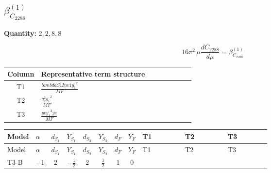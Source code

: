 \documentclass[8pt]{article}
\begin{document}
\begin{landscape}
\section*{$\beta_{C_{2288}}^{(1)}$}
\noindent\textbf{Quantity: }$\mathrm{2,2,8,8}$\par\smallskip
\[16\pi^2\,\mu\frac{d C_{2288}}{d\mu}=\beta_{C_{2288}}^{(1)}\]
\begin{center}
\begin{tabular}{@{}c >{\raggedright\arraybackslash}p{0.82\linewidth}@{}}
\toprule
Column & Representative term structure \\
\midrule
T1 & \(\displaystyle \frac{lambdaS1Inv1 \overline{y_{1}}^{2}}{MF}\) \\
\midrule
T2 & \(\displaystyle \frac{g_{2}^{2} \overline{y_{1}}^{2}}{MF}\) \\
\midrule
T3 & \(\displaystyle \frac{ye \overline{y_{1}}^{2} \overline{ye}}{MF}\) \\
\midrule
\bottomrule
\end{tabular}
\end{center}
\smallskip
\tiny
\begin{longtable}{@{}llcccccc >{\raggedright\arraybackslash}p{0.21\linewidth} >{\raggedright\arraybackslash}p{0.21\linewidth} >{\raggedright\arraybackslash}p{0.21\linewidth}@{}}
\toprule
Model & $\alpha$ & $d_{S_1}$ & $Y_{S_1}$ & $d_{S_2}$ & $Y_{S_2}$ & $d_F$ & $Y_F$ & T1 & T2 & T3 \\
\midrule
\endfirsthead
\toprule
Model & $\alpha$ & $d_{S_1}$ & $Y_{S_1}$ & $d_{S_2}$ & $Y_{S_2}$ & $d_F$ & $Y_F$ & T1 & T2 & T3 \\
\midrule
\endhead
T3-B & $-1$ & $2$ & $-\frac{1}{2}$ & $2$ & $\frac{1}{2}$ & $1$ & $0$ & \scriptsize\adjustbox{max width=\linewidth}{$\begin{gathered} \frac{lambdaS1Inv1 \overline{y_{1}}^{2}}{2 MF}\end{gathered}$} & \scriptsize\adjustbox{max width=\linewidth}{$\begin{gathered} \frac{3 g_{2}^{2} \overline{y_{1}}^{2}}{4 MF}\end{gathered}$} & \scriptsize\adjustbox{max width=\linewidth}{$\begin{gathered} - \frac{ye \overline{y_{1}}^{2} \overline{ye}}{4 MF}\end{gathered}$} \\
\midrule
\bottomrule
\end{longtable}
\clearpage

\end{landscape}
\end{document}
